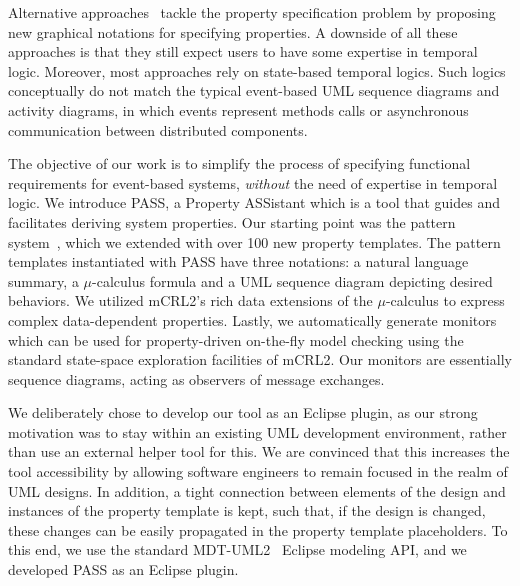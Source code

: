 \documentclass[letter]{llncs}
\begin{document}
Alternative
approaches~\cite{Autili:2007:GSS:1290845.1290859,Lee97agraphical,Smith:2001:ECG:882477.883639,Knapp:2006:MCU:1762828.1762836,Lilius99vuml:a,Kugler:2005:TLS:2140653.2140692,MVPSA}
tackle the property specification problem by proposing new graphical
notations for specifying properties. A downside of all these approaches is
that they still expect users to have some expertise in temporal logic.
Moreover, most approaches rely on state-based temporal logics. Such
logics conceptually do not match the typical event-based UML sequence
diagrams and activity diagrams, in which events represent methods calls
or asynchronous communication between distributed components.

The objective of our work is to simplify the process of specifying
functional requirements for event-based systems, \emph{without}
the need of expertise in temporal logic.  We introduce PASS,
a Property ASSistant which is a tool that guides and facilitates 
deriving system properties. Our starting point was the pattern
system~\cite{Dwyer:1999:PPS:302405.302672}, which we extended with over
100 new property templates. 
The pattern templates instantiated with PASS have three notations:
a natural language summary, a $\mu$-calculus formula and a UML sequence
diagram depicting desired behaviors.  We utilized mCRL2's rich data
extensions of the $\mu$-calculus to express complex data-dependent
properties.  Lastly, we automatically generate
monitors which can be used for property-driven on-the-fly model checking
using the standard state-space exploration facilities
of mCRL2.
Our monitors are essentially sequence diagrams,  acting as
observers of message exchanges.

We deliberately chose to develop our tool as an Eclipse plugin, as
our strong motivation was to stay within an existing UML development
environment, rather than use an external helper tool for this.  We are
convinced that this increases the tool accessibility by allowing software
engineers to remain focused in the realm of UML designs.  In addition,
a tight connection between elements of the design and instances of the property
template is kept, such that, if the design is changed, these changes can
be easily propagated in the property template placeholders.  To this end,
we use the standard MDT-UML2~\cite{MDTUML2} Eclipse modeling API,
and we developed PASS as an Eclipse plugin.
\end{document}

